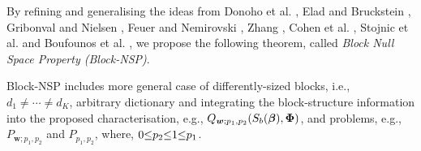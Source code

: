 By refining and generalising the ideas from Donoho et al. \cite{Donoho2001,Donoho2003}, Elad and Bruckstein \cite{Elad2001,Elad2002a}, Gribonval and Nielsen \cite{Gribonval2003,Gribonval2003a,Gribonval2004a,Gribonval2007}, Feuer and Nemirovski \cite{Feuer2003}, Zhang \cite{Zhang2005a}, Cohen et al. \cite{Cohen2009}, Stojnic et al. \cite{Stojnic2008,Stojnic2009a} and Boufounos et al. \cite{Boufounos2011}, we propose the following theorem, called \emph{Block Null Space Property (Block-NSP)}.

Block-NSP includes more general case of differently-sized blocks, i.e., $d_1 {\neq} \cdots {\neq} d_K$, arbitrary dictionary and integrating the block-structure information into the proposed characterisation, e.g., $Q_{\boldsymbol{w};p_1,p_2}(S_b(\boldsymbol{\beta}),\boldsymbol{\Phi})$, and problems, e.g., $P_{\boldsymbol{w};p_1,p_2}$ and $P_{p_1,p_2}$, where, $0 {\leq} p_2 {\leq} 1 {\leq} p_1$.
